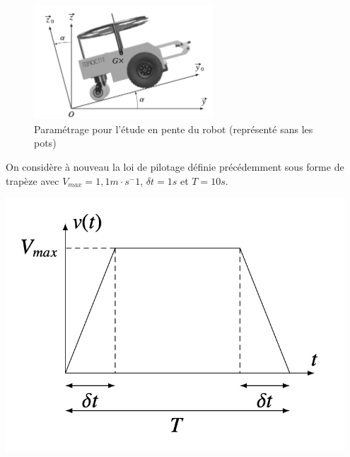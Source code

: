 \begin{figure}[!htb]
\begin{center}
\includegraphics[width=0.6\textwidth]{images/parametrage_pente}
\caption{Paramétrage pour l’étude en pente du robot (représenté sans les pots) \label{fig7}}
\end{center}
\end{figure}


\begin{minipage}{0.35\textwidth}
On considère à nouveau la loi de pilotage définie précédemment sous
forme de trapèze avec $V_{max}=1,1m\cdot s^-1$, $\delta t=1s$ et $T=10s$.
\end{minipage}
\begin{minipage}{0.65\textwidth}
\begin{center}
\includegraphics[width=0.95\textwidth]{images/trapeze}
\end{center}
\end{minipage}





